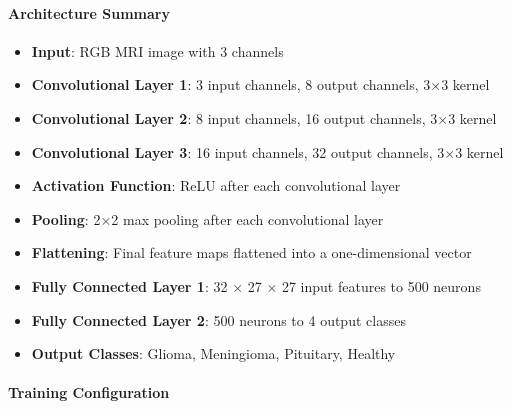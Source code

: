 \documentclass[conference]{IEEEtran}
\begin{document}
\paragraph{Architecture Summary}
\begin{itemize}
    \item \textbf{Input}: RGB MRI image with 3 channels
    \item \textbf{Convolutional Layer 1}: 3 input channels, 8 output channels, 3$\times$3 kernel
    \item \textbf{Convolutional Layer 2}: 8 input channels, 16 output channels, 3$\times$3 kernel
    \item \textbf{Convolutional Layer 3}: 16 input channels, 32 output channels, 3$\times$3 kernel
    \item \textbf{Activation Function}: ReLU after each convolutional layer
    \item \textbf{Pooling}: 2$\times$2 max pooling after each convolutional layer
    \item \textbf{Flattening}: Final feature maps flattened into a one-dimensional vector
    \item \textbf{Fully Connected Layer 1}: 32 $\times$ 27 $\times$ 27 input features to 500 neurons
    \item \textbf{Fully Connected Layer 2}: 500 neurons to 4 output classes
    \item \textbf{Output Classes}: Glioma, Meningioma, Pituitary, Healthy
\end{itemize}

\vspace{0.5cm}
\paragraph{Training Configuration}
\end{document}
